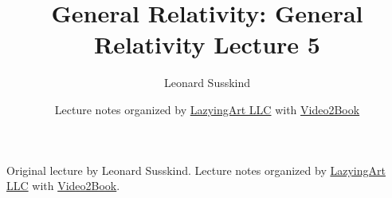 \documentclass[11pt,oneside]{book}
\begin{document}
\frontmatter
\title{General Relativity: General Relativity Lecture 5}
\author{Leonard Susskind}
\date{Lecture notes organized by \href{https://lazying.art}{LazyingArt LLC} with \href{https://github.com/lachlanchen/Video2Book}{Video2Book}}
\maketitle
\begin{center}
\small Original lecture by Leonard Susskind. Lecture notes organized by \href{https://lazying.art}{LazyingArt LLC} with \href{https://github.com/lachlanchen/Video2Book}{Video2Book}.
\end{center}
\clearpage
\mainmatter

\end{document}
